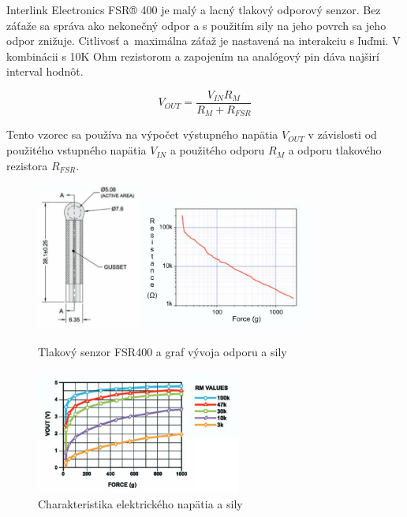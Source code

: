 Interlink Electronics FSR® 400 je malý a lacný tlakový odporový senzor. Bez záťaže sa správa ako nekonečný odpor a s použitím sily na jeho povrch sa jeho odpor znižuje. Citlivosť a~maximálna záťaž je nastavená na interakciu s ľuďmi\cite{fsr400}. V kombinácii s 10K Ohm rezistorom a zapojením na analógový pin dáva najširí interval hodnôt. 

\[
V_{OUT} = \frac{V_{IN} R_M} {R_M + R_{FSR}}
\]

Tento vzorec sa používa na výpočet výstupného napätia $V_{OUT}$ v závislosti od použitého vstupného napätia $V_{IN}$ a použitého odporu $R_M$ a odporu tlakového rezistora $R_{FSR}$.

\begin{figure}[hbt]
	\centering
	\includegraphics[width=0.3\textwidth]{obrazky-figures/fsr400.png}
	\includegraphics[width=0.5\textwidth]{obrazky-figures/FSRodporSila.png}
	\caption{Tlakový senzor FSR400 a graf vývoja odporu a sily}
	\label{Odpor sila}
\end{figure}

\begin{figure}[hbt]
	\centering
	\includegraphics[width=0.6\textwidth]{obrazky-figures/fsr-charakteristikaV-force.png}
	\caption{Charakteristika elektrického napätia a sily}
	\label{Characteristics}
\end{figure}

